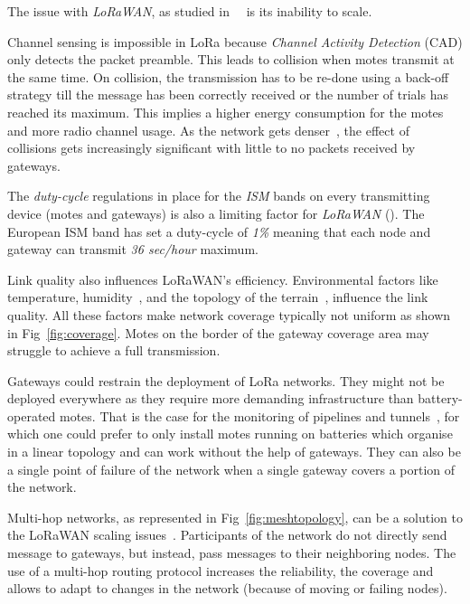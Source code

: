 

The issue with \emph{LoRaWAN}, as studied 
in~\cite{8030482}~\cite{10.1145/2988287.2989163} is its inability to scale. 

Channel sensing is impossible in LoRa because \emph{Channel Activity Detection}
(CAD) only detects the packet preamble. %
This leads to collision when motes transmit at the same time.
On collision, the transmission has to be re-done using a back-off strategy till the
message has been correctly received or the number of trials has reached its
maximum.
This implies a higher energy consumption for the motes and more radio 
channel usage.
As the network gets denser~\cite{8030482}, the effect of collisions gets
increasingly significant with little to no packets received by gateways.


The \emph{duty-cycle} regulations in place for the \emph{ISM} bands on every
transmitting device (motes and gateways) is also a limiting factor 
for \emph{LoRaWAN} (\cite{8030482}).
The European ISM band has set a duty-cycle of \emph{1\%} meaning that each node 
and gateway can transmit \emph{36 sec/hour} maximum. 


Link quality also influences LoRaWAN's efficiency. 
Environmental factors like temperature,
humidity~\cite{evaluation_of_the_reliability_of_lora}, and the topology of the
terrain~\cite{lorajambalaya}, influence the link quality.
All these factors make network coverage typically not uniform 
as shown in Fig~\ref{fig:coverage}.
Motes on the border of the gateway coverage area may struggle to
achieve a full transmission. 

Gateways could restrain the deployment of LoRa networks.
They might not be deployed everywhere as they require more demanding infrastructure 
than battery-operated motes.
That is the case for the monitoring of pipelines and tunnels~\cite{Abrardo_2019},
for which one could prefer to only install motes running on batteries 
which organise in a linear topology and can work without the help of gateways.
They can also be a single point of failure of the network when a single
gateway covers a portion of the network. 



Multi-hop networks, as represented in Fig~\ref{fig:meshtopology}, can be a solution to
the LoRaWAN scaling issues~\cite{8115756}.
Participants of the network do not directly send message to gateways, but
instead, pass messages to their neighboring nodes.
The use of a multi-hop routing protocol increases the reliability, the coverage
and allows to adapt to changes in the network (because of moving or failing nodes).

